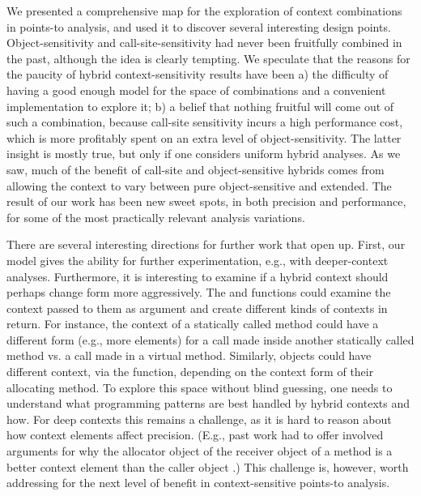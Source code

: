 We presented a comprehensive map for the exploration of context
combinations in points-to analysis, and used it to discover several
interesting design points. Object-sensitivity and
call-site-sensitivity had never been fruitfully combined in the past,
although the idea is clearly tempting. We speculate that the reasons
for the paucity of hybrid context-sensitivity results have been a) the
difficulty of having a good enough model for the space of combinations
and a convenient implementation to explore it; b) a belief that
nothing fruitful will come out of such a combination, because
call-site sensitivity incurs a high performance cost, which is more
profitably spent on an extra level of object-sensitivity. The latter
insight is mostly true, but only if one considers uniform hybrid
analyses. As we saw, much of the benefit of call-site and
object-sensitive hybrids comes from allowing the context to vary
between pure object-sensitive and extended. The result of our work has
been new sweet spots, in both precision and performance, for some of
the most practically relevant analysis variations.

There are several interesting directions for further work that open
up. First, our model gives the ability for further experimentation,
e.g., with deeper-context analyses. Furthermore, it is interesting to
examine if a hybrid context should perhaps change form more
aggressively. The  and 
functions could examine the context passed to them as argument and
create different kinds of contexts in return. For instance, the
context of a statically called method could have a different form
(e.g., more elements) for a call made inside another statically called
method vs. a call made in a virtual method. Similarly, objects could
have different context, via the  function, depending
on the context form of their allocating method. To explore this space
without blind guessing, one needs to understand what programming
patterns are best handled by hybrid contexts and how. For deep
contexts this remains a challenge, as it is hard to reason about how
context elements affect precision. (E.g., past work had to offer
involved arguments for why the allocator object of the receiver object
of a method is a better context element than the caller object 
\cite{popl:2011:Smaragdakis}.) This challenge is, however, worth addressing
for the next level of benefit in context-sensitive points-to analysis.
